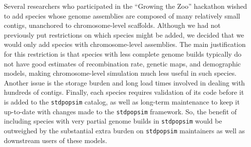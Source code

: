 \documentclass[hidelinks]{article}
\newcommand{\stdpopsim}{\texttt{stdpopsim}\xspace}
\begin{document}
Several researchers who participated in the ``Growing the Zoo'' hackathon wished to add species
whose genome assemblies are composed of many relatively small contigs,
unanchored to chromosome-level scaffolds.
Although we had not previously put restrictions on which species might be added,
we decided that we would only add species with chromosome-level assemblies.
The main justification for this restriction is that
species with less complete genome builds typically do not have good estimates of recombination rate, genetic maps, and demographic models,
making chromosome-level simulation much less useful in such species.
Another issue is the storage burden and long load times involved in dealing with
hundreds of contigs.
Finally, each species requires validation of its code before it is added to the \stdpopsim catalog,
as well as long-term maintenance to keep it up-to-date with changes made to the \stdpopsim framework.
So, the benefit of including species with very partial genome builds in \stdpopsim
would be outweighed by the substantial extra burden on \stdpopsim maintainers as well as
downstream users of these models.
\end{document}
